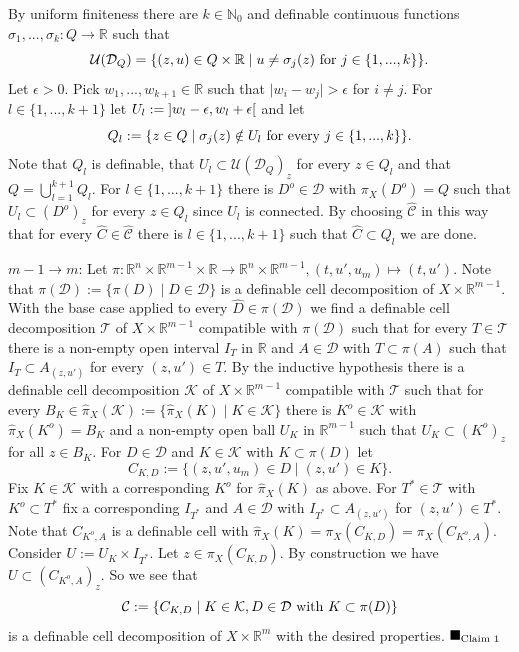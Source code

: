 \documentclass[12pt]{article}
\def\vs{\vspace}
\begin{document}
\vs{0.2cm}
By uniform finiteness there are $k \in \mathbb{N}_0$ and definable continuous functions $\sigma_1,...,\sigma_k:Q \to \mathbb{R}$ such that 
$$\mathcal{U}(\mathcal{D}_Q)=\{(z,u) \in Q \times \mathbb{R} \mid u \neq \sigma_j(z) \textnormal{ for }j \in \{1,...,k\}\}.$$
Let $\epsilon>0$. Pick $w_1,...,w_{k+1} \in \mathbb{R}$ such that $\vert{w_i-w_j}\vert>\epsilon$ for $i \neq j$. For $l \in \{1,...,k+1\}$ let $U_l:= \textnormal{}]w_l-\epsilon,w_l+\epsilon[$ and let 
$$Q_l:=\{z \in Q \mid \sigma_j(z) \notin U_l \textnormal{ for every }j \in \{1,...,k\}\}.$$
Note that $Q_l$ is definable, that $U_l \subset \mathcal{U}(\mathcal{D}_Q)_z$ for every $z \in Q_l$ and that $Q=\bigcup_{l=1}^{k+1}Q_l$. For $l \in \{1,...,k+1\}$ there is $D^o \in \mathcal{D}$ with $\pi_X(D^o) = Q$ such that $U_l \subset (D^o)_z$ for every $z \in Q_l$ since $U_l$ is connected. By choosing $\hat{\mathcal{C}}$ in this way that for every $\hat{C} \in \hat{\mathcal{C}}$ there is $l \in \{1,...,k+1\}$ such that $\hat{C} \subset Q_l$ we are done. 

\vs{0.3cm}
$m-1 \to m$: Let $\pi:\mathbb{R}^n \times \mathbb{R}^{m-1} \times \mathbb{R} \to \mathbb{R}^n \times \mathbb{R}^{m-1}, (t,u',u_m) \mapsto (t,u')$. Note that $\pi(\mathcal{D}):=\{\pi(D) \mid D \in \mathcal{D}\}$ is a definable cell decomposition of $X \times \mathbb{R}^{m-1}$. With the base case applied to every $\hat{D} \in \pi(\mathcal{D})$ we find a definable cell decomposition $\mathcal{T}$ of $X \times \mathbb{R}^{m-1}$ compatible with $\pi(\mathcal{D})$ such that for every $T \in \mathcal{T}$ there is a non-empty open interval $I_T$ in $\mathbb{R}$ and $A \in \mathcal{D}$ with $T \subset \pi(A)$ such that $I_T \subset A_{(z,u')}$ for every $(z,u') \in T$. By the inductive hypothesis there is a definable cell decomposition $\mathcal{K}$ of $X \times \mathbb{R}^{m-1}$ compatible with $\mathcal{T}$ such that for every $B_K \in \hat{\pi}_X(\mathcal{K}):=\{\hat{\pi}_X(K) \mid K \in \mathcal{K}\}$ there is $K^o \in \mathcal{K}$ with $\hat{\pi}_X(K^o)=B_K$ and a non-empty open ball $U_K$ in $\mathbb{R}^{m-1}$ such that $U_K \subset (K^o)_z$ for all $z \in B_K$. For $D \in \mathcal{D}$ and $K \in \mathcal{K}$ with $K \subset \pi(D)$ let 
$$C_{K,D}:=\{(z,u',u_m) \in D \mid (z,u') \in K\}.$$
Fix $K \in \mathcal{K}$ with a corresponding $K^o$ for $\hat{\pi}_X(K)$ as above. For $T^* \in \mathcal{T}$ with $K^o \subset T^*$ fix a corresponding $I_{T^*}$ and $A \in \mathcal{D}$ with $I_{T^*} \subset A_{(z,u')}$ for $(z,u') \in T^*$. Note that $C_{K^o,A}$ is a definable cell with $\hat{\pi}_X(K)=\pi_X(C_{K,D})=\pi_X(C_{K^o,A})$. Consider $U:=U_K \times I_{T^*}$. Let $z \in \pi_X(C_{K,D})$. By construction we have $U \subset (C_{K^o,A})_z$. So we see that
$$\mathcal{C}:=\{C_{K,D} \mid K \in \mathcal{K}, D \in \mathcal{D} \textnormal{ with } K \subset \pi(D)\}$$
is a definable cell decomposition of $X \times \mathbb{R}^m$ with the desired properties.
\hfill$\blacksquare_{\textnormal{Claim }1}$ 
\end{document}
